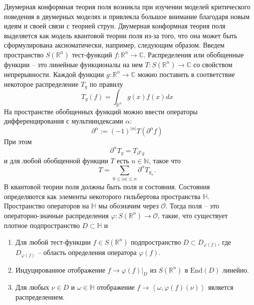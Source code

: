 Двумерная конформная теория поля возникла при изучении моделей критического поведения в двумерных моделях и привлекла большое внимание благодаря новым идеям и своей связи с теорией струн. Двумерная конформная теория поля выделяется как модель квантовой теории поля из-за того, что она может быть сформулирована аксиоматически, например, следующим образом. 
Введем пространство $S(\mathbb{R}^{n})$ тест-функций $f:\mathbb{R}^{n}\to \mathbb{C}$. Распределения или обобщенные функции -- это линейные функционалы на нем $T:S(\mathbb{R}^{n})\to \mathbb{C}$ со свойством непрерывности. Каждой функции $g:\mathbb{R}^{n}\to \mathbb{C}$ можно поставить в соответствие некоторое распределение $T_{g}$ по правилу
\begin{equation}
  \label{eq:30}
  T_{g}(f)=\int_{\mathbb{R}^{n}}g(x)f(x) dx
\end{equation}
На пространстве обобщенных функций можно ввести операторы дифференцирования с мультииндексами $\alpha$:
\begin{equation}
  \label{eq:41}
  \partial^{\alpha}:=(-1)^{|\alpha|}T(\partial^{\alpha} f)
\end{equation}
При этом
\begin{equation}
  \label{eq:42}
  \partial^{\alpha}T_{g}=T_{\partial ^{\alpha}g}
\end{equation}
и для любой обобщенной функции $T$ есть $n\in \mathbb{N}$, такое что
\begin{equation}
  \label{eq:49}
  T=\sum_{0\leq |\alpha|\leq n}\partial^{\alpha} T_{g_{\alpha}}.
\end{equation}
В квантовой теории поля должны быть поля и состояния. Состояния определяются как элементы некоторого гильбертова пространства $\mathbb{H}$. Пространство операторов на $\mathbb{H}$ мы обозначим через $\mathcal{O}$. Тогда поля -- это операторно-значные распределения $\varphi:S(\mathbb{R}^{n})\to \mathcal{O}$, такие, что существует плотное подпространство $D\subset \mathbb{H}$ и
\begin{enumerate}
\item Для любой тест-функции $f\in S(\mathbb{R}^{n})$ подпространство $D\subset D_{\varphi(f)}$, где $D_{\varphi(f)}$ -- область определения оператора $\varphi(f)$.
\item Индуцированное отображение $f\to \varphi(f)|_{D}$ из $S(\mathbb{R}^{n})$ в $\mathrm{End}(D)$ линейно.
\item Для любых $\nu\in D$ и $\omega\in \mathbb{H}$ отображение $f\to \left<\omega,\varphi(f)(\nu)\right>$ является распределением. 
\end{enumerate}

